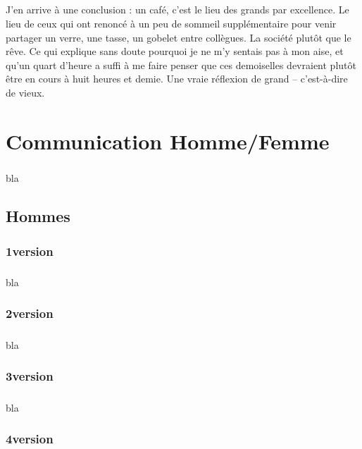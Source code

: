 \paragraph{}
J’en arrive à une conclusion : un café, c’est le lieu des grands par excellence. Le lieu de ceux qui ont renoncé à un peu de sommeil supplémentaire pour venir partager un verre, une tasse, un gobelet entre collègues. La société plutôt que le rêve. Ce qui explique sans doute pourquoi je ne m’y sentais pas à mon aise, et qu’un quart d’heure a suffi à me faire penser que ces demoiselles devraient plutôt être en cours à huit heures et demie. Une vraie réflexion de grand – c’est-à-dire de vieux.

\chapter{Communication Homme/Femme}
\paragraph{}
bla

\section{Hommes}
\subsection{1\ier version}
\paragraph{}
bla

\subsection{2\ieme version}
\paragraph{}
bla

\subsection{3\ieme version}
\paragraph{}
bla

\subsection{4\ieme version}

